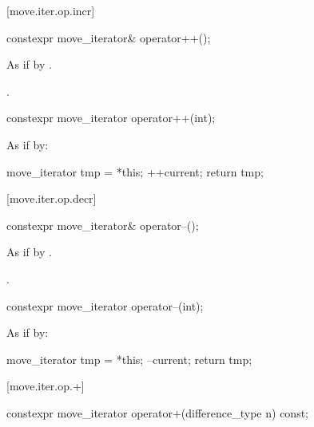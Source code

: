 [move.iter.op.incr]{}

%
\begin{itemdecl}
constexpr move_iterator& operator++();
\end{itemdecl}

\begin{itemdescr}
\pnum
\effects As if by .

\pnum
\returns {}.
\end{itemdescr}

%
\begin{itemdecl}
constexpr move_iterator operator++(int);
\end{itemdecl}

\begin{itemdescr}
\pnum
\effects
As if by:
\begin{codeblock}
move_iterator tmp = *this;
++current;
return tmp;
\end{codeblock}
\end{itemdescr}

[move.iter.op.decr]{}

%
\begin{itemdecl}
constexpr move_iterator& operator--();
\end{itemdecl}

\begin{itemdescr}
\pnum
\effects As if by .

\pnum
\returns {}.
\end{itemdescr}

%
\begin{itemdecl}
constexpr move_iterator operator--(int);
\end{itemdecl}

\begin{itemdescr}
\pnum
\effects
As if by:
\begin{codeblock}
move_iterator tmp = *this;
--current;
return tmp;
\end{codeblock}
\end{itemdescr}

[move.iter.op.+]{}

%
\begin{itemdecl}
constexpr move_iterator operator+(difference_type n) const;
\end{itemdecl}

